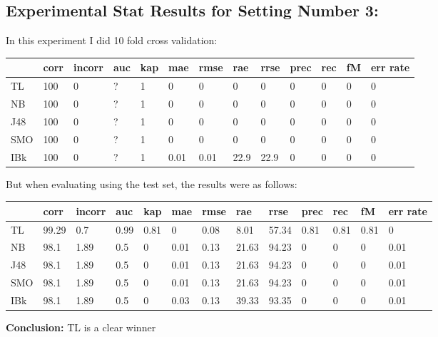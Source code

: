 \documentclass[a4paper,12pt, english]{article}
\begin{document}
\subsection{Experimental Stat Results for Setting Number 3:}
In this experiment I did 10 fold cross validation:
\begin{small}
\begin{center}
    \begin{tabular}{ | l | l | l | l | l | l | l | l | l | l | l | l | l |}
    \hline
      	& corr & incorr  & auc & kap & mae & rmse & rae & rrse & prec & rec & fM & err rate\\ \hline
      	TL & 100 & 0 & ? & 1 & 0 & 0 & 0 & 0 & 0 & 0 & 0 & 0\\ \hline
	NB & 100 & 0 & ? & 1 & 0 & 0 & 0 & 0 & 0 & 0 & 0 & 0\\ \hline
	J48 & 100 & 0 & ? & 1 & 0 & 0 & 0 & 0 & 0 & 0 & 0 & 0\\ \hline
	SMO & 100 & 0 & ? & 1 & 0 & 0 & 0 & 0 & 0 & 0 & 0 & 0\\ \hline
	IBk & 100 & 0 & ? & 1 & 0.01 & 0.01 & 22.9 & 22.9 & 0 & 0 & 0 & 0\\ \hline  
    \end{tabular}       
\end{center}
\end{small}

But when evaluating using the test set, the results were as follows:
\begin{small}
\begin{center}
    \begin{tabular}{ | l | l | l | l | l | l | l | l | l | l | l | l | l |}
    \hline
      	& corr & incorr  & auc & kap & mae & rmse & rae & rrse & prec & rec & fM & err rate\\ \hline
      	TL & 99.29 & 0.7 & 0.99 & 0.81 & 0 & 0.08 & 8.01 & 57.34 & 0.81 & 0.81 & 0.81 & 0\\ \hline
	NB & 98.1 & 1.89 & 0.5 & 0 & 0.01 & 0.13 & 21.63 & 94.23 & 0 & 0 & 0 & 0.01\\ \hline
	J48 & 98.1 & 1.89 & 0.5 & 0 & 0.01 & 0.13 & 21.63 & 94.23 & 0 & 0 & 0 & 0.01\\ \hline
	SMO & 98.1 & 1.89 & 0.5 & 0 & 0.01 & 0.13 & 21.63 & 94.23 & 0 & 0 & 0 & 0.01\\ \hline
	IBk & 98.1 & 1.89 & 0.5 & 0 & 0.03 & 0.13 & 39.33 & 93.35 & 0 & 0 & 0 & 0.01\\ \hline  
    \end{tabular}       
\end{center}
\end{small}
\textbf{Conclusion:} TL is a clear winner
\end{document}
